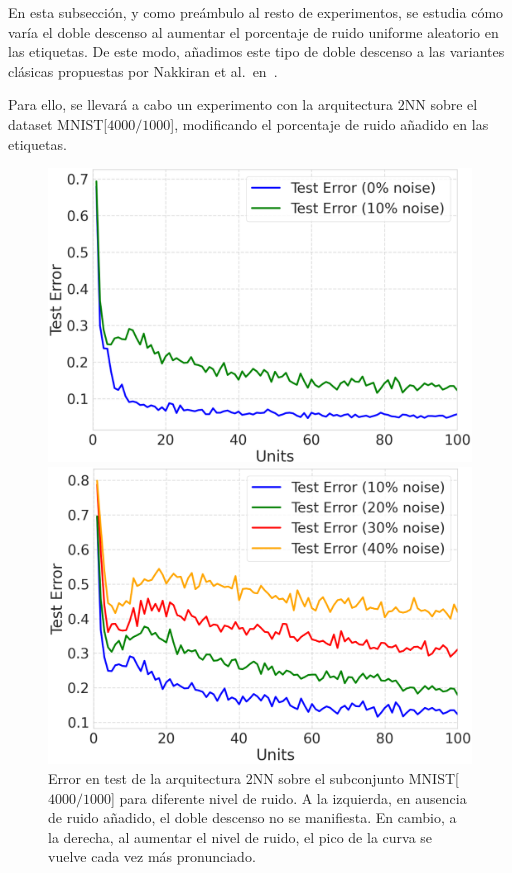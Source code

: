 En esta subsección, y como preámbulo al resto de experimentos, se estudia cómo varía el doble descenso al aumentar el porcentaje de ruido uniforme aleatorio en las etiquetas. De este modo, añadimos este tipo de doble descenso a las variantes clásicas propuestas por Nakkiran et al.\ en~\cite{Nakkiran2019}.

Para ello, se llevará a cabo un experimento con la arquitectura $2$NN sobre el dataset MNIST[$4000/1000$], modificando el porcentaje de ruido añadido en las etiquetas.

\begin{figure}[h]
    \centering
    \begin{minipage}{0.45\textwidth}
        \centering
        \includegraphics[width=\linewidth]{img/experiments/noise-wise-dd1.png}
    \end{minipage}
    \begin{minipage}{0.45\textwidth}
        \centering
        \includegraphics[width=\linewidth]{img/experiments/noise-wise-dd2.png}
    \end{minipage}
    \caption[Doble descenso para distintos niveles de ruido.]{Error en test de la arquitectura $2$NN sobre el subconjunto MNIST[$4000/1000$] para diferente nivel de ruido. A la izquierda, en ausencia de ruido añadido, el doble descenso no se manifiesta. En cambio, a la derecha, al aumentar el nivel de ruido, el pico de la curva se vuelve cada vez más pronunciado.}\label{fig:noise-wise-dd}
\end{figure}

